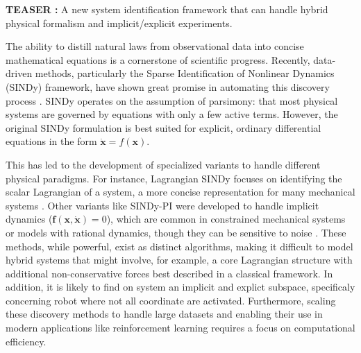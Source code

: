 \documentclass[12pt]{article}
\begin{document}
\noindent
\textbf{TEASER : } A new system identification framework that can handle hybrid physical formalism and implicit/explicit experiments.

\noindent
The ability to distill natural laws from observational data into concise mathematical equations is a cornerstone of scientific progress. Recently, data-driven methods, particularly the Sparse Identification of Nonlinear Dynamics (SINDy) framework, have shown great promise in automating this discovery process \cite{Brunton2016_SINDy}. SINDy operates on the assumption of parsimony: that most physical systems are governed by equations with only a few active terms. However, the original SINDy formulation is best suited for explicit, ordinary differential equations in the form $\dot{\mathbf{x}} = f(\mathbf{x})$.

This has led to the development of specialized variants to handle different physical paradigms. For instance, Lagrangian SINDy focuses on identifying the scalar Lagrangian of a system, a more concise representation for many mechanical systems \cite{Chu2020_LagrangianSINDy, Purnomo2023_xLSINDy}. Other variants like SINDy-PI were developed to handle implicit dynamics ($\mathbf{f}(\mathbf{x}, \dot{\mathbf{x}}) = 0$), which are common in constrained mechanical systems or models with rational dynamics, though they can be sensitive to noise \cite{Kaheman2020_SINDyPI}. These methods, while powerful, exist as distinct algorithms, making it difficult to model hybrid systems that might involve, for example, a core Lagrangian structure with additional non-conservative forces best described in a classical framework. In addition, it is likely to find on system an implicit and explict subspace, specificaly concerning robot where not all coordinate are activated. Furthermore, scaling these discovery methods to handle large datasets and enabling their use in modern applications like reinforcement learning requires a focus on computational efficiency.
\end{document}
